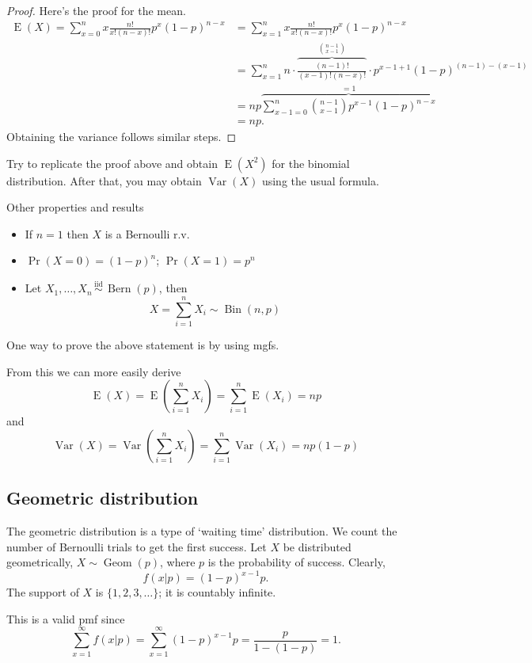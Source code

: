 \documentclass[
]{book}
\providecommand{\tightlist}{%
  \setlength{\itemsep}{0pt}\setlength{\parskip}{0pt}}
\DeclareMathOperator{\E}{E}
\DeclareMathOperator{\Var}{Var}
\DeclareMathOperator{\Bin}{Bin}
\DeclareMathOperator{\Bern}{Bern}
\DeclareMathOperator{\Geom}{Geom}
\newcommand{\iid}{\,\overset{\text{iid}}{\sim}\,}
\theoremstyle{definition}
\theoremstyle{definition}
\theoremstyle{definition}
\theoremstyle{definition}
\theoremstyle{remark}
\begin{document}
\begin{proof}
Here's the proof for the mean.
\begin{align*}
\E(X) 
= \sum_{x=0}^n x \frac{n!}{x!(n-x)!} p^x (1-p)^{n-x} 
&= \sum_{x=1}^n x \frac{n!}{x!(n-x)!} p^x (1-p)^{n-x} \\
&=\sum_{x=1}^n n \cdot \overbrace{\frac{(n-1)!}{(x-1)!(n-x)!}}^{{n-1 \choose x-1}} \cdot p^{x-1+1} (1-p)^{(n-1)-(x-1)} \\
&= np \overbrace{\sum_{x-1=0}^n  {n-1 \choose x-1} p^{x-1} (1-p)^{n-x}}^{=1} \\
&= np. 
\end{align*}
Obtaining the variance follows similar steps.
\end{proof}

Try to replicate the proof above and obtain \(\E(X^2)\) for the binomial distribution. After that, you may obtain \(\Var(X)\) using the usual formula.

Other properties and results

\begin{itemize}
\tightlist
\item
  If \(n=1\) then \(X\) is a Bernoulli r.v.
\item
  \(\Pr(X=0)=(1-p)^n\); \(\Pr(X=1)=p^n\)
\item
  Let \(X_1,\dots,X_n\iid\Bern(p)\), then
  \[
  X = \sum_{i=1}^n X_i \sim \Bin(n,p)
  \]
\end{itemize}

One way to prove the above statement is by using mgfs.

From this we can more easily derive
\[
\E(X) = \E\left(\sum_{i=1}^n X_i \right) = \sum_{i=1}^n \E(X_i) = np
\]
and
\[
\Var(X) = \Var\left(\sum_{i=1}^n X_i \right) = \sum_{i=1}^n \Var(X_i) = np(1-p)
\]

\hypertarget{geometric-distribution}{%
\subsection{Geometric distribution}\label{geometric-distribution}}

The geometric distribution is a type of `waiting time' distribution.
We count the number of Bernoulli trials to get the first success.
Let \(X\) be distributed geometrically, \(X\sim\Geom(p)\), where \(p\) is the probability of success. Clearly,
\[
  f(x|p)=(1-p)^{x-1}p.
\]
The support of \(X\) is \(\{1,2,3,\dots\}\); it is countably infinite.

This is a valid pmf since
\[
\sum_{x=1}^\infty f(x|p) = \sum_{x=1}^\infty (1-p)^{x-1}p = \frac{p}{1-(1-p)} = 1.
\]
\end{document}
